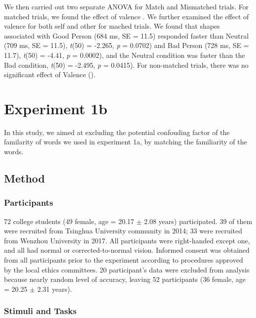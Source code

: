 \documentclass[man]{apa6}
\begin{document}
We then carried out two separate ANOVA for Match and Mismatched trials. For matched trials, we found the effect of valence . We further examined the effect of valence for both self and other for mached trials. We found that shapes associated with Good Person (684 ms, SE = 11.5) responded faster than Neutral (709 ms, SE = 11.5), \emph{t}(50) = -2.265, \emph{p} = 0.0702) and Bad Person (728 ms, SE = 11.7), \emph{t}(50) = -4.41, \emph{p} = 0.0002), and the Neutral condition was faster than the Bad condition, \emph{t}(50) = -2.495, \emph{p} = 0.0415). For non-matched trials, there was no significant effect of Valence ().

\hypertarget{experiment-1b}{%
\section{Experiment 1b}\label{experiment-1b}}

In this study, we aimed at excluding the potential confouding factor of the familarity of words we used in experiment 1a, by matching the familiarity of the words.

\hypertarget{method}{%
\subsection{Method}\label{method}}

\hypertarget{participants-1}{%
\subsubsection{Participants}\label{participants-1}}

72 college students (49 female, age = 20.17 \(\pm\) 2.08 years) participated. 39 of them were recruited from Tsinghua University community in 2014; 33 were recruited from Wenzhou University in 2017. All participants were right-handed except one, and all had normal or corrected-to-normal vision. Informed consent was obtained from all participants prior to the experiment according to procedures approved by the local ethics committees. 20 participant's data were excluded from analysis because nearly random level of accuracy, leaving 52 participants (36 female, age = 20.25 \(\pm\) 2.31 years).

\hypertarget{stimuli-and-tasks-1}{%
\subsubsection{Stimuli and Tasks}\label{stimuli-and-tasks-1}}
\end{document}
